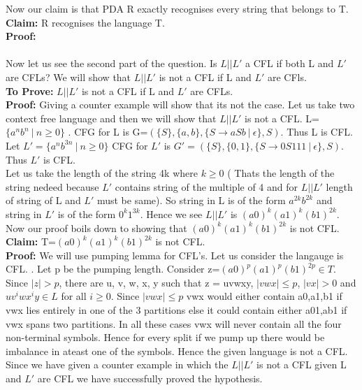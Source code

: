 \documentclass{article}
\begin{document}
Now our claim is that PDA R exactly recognises every string that belongs to T. \\
\textbf{Claim:} R recognises the language T.\\
\textbf{Proof:}\\
\\
\newline
Now let us see the second part of the question. Is $L||L'$ a CFL if both L and $L'$ are
CFLs? We will show that $L|| L'$ is not a CFL if L and $L'$ are CFls. \\
\textbf{To Prove:} $L|| L'$ is not a CFL if L and $L'$ are CFLs. \\
\textbf{Proof:} Giving a counter example will show that its not the case. Let us take two context free language and then we will show that $L || L'$ is not a CFL. L=$\{a^nb^n \ | \ n \geq 0\}$ . CFG for L is G=$(\{S\},\{a,b\},\{S \rightarrow aSb \ | \ \epsilon\},S)$. Thus L is CFL. Let $ L'=\{a^nb^{3n} \ | \ n \geq 0\}$ CFG for $L'$ is $G' =(\{S\},\{0,1\},\{S \rightarrow 0S111 \ | \ \epsilon\},S)$. Thus $L'$ is CFL.\\
Let us take the length of the string 4k where $k \geq 0$ ( Thats the length of the string nedeed because $L'$ contains string of the multiple of 4 and for $L || L'$ length of string of L and $L'$ must be same). So string in L is of the form $a^{2k}b^{2k}$ and string in $L' $ is of the form $0^{k}1^{3k}$. Hence we see $L || L'$ is $(a0)^k (a1)^k (b1)^{2k}$. Now our proof boils down to showing that $(a0)^k (a1)^k (b1)^{2k}$ is not CFL.\\
\textbf{Claim:} T=$(a0)^k (a1)^k (b1)^{2k}$ is not CFL.\\
\textbf{Proof:} We will use pumping lemma for CFL's. Let us consider the langauge is CFL. . Let p be the pumping length. Consider z=$(a0)^p (a1)^p (b1)^{2p} \in T$. Since $|z| > p$, there are u, v, w, x, y such that z = uvwxy, $|vwx| \leq p$, $|vx| > 0$ and $ uv^{i}wx^{i}y \in L$ for all $i \geq 0$. Since $|vwx| \leq p$ vwx would either contain a0,a1,b1 if vwx lies entirely in one of the 3 partitions else it could contain either a01,ab1 if vwx spans two partitions. In all these cases vwx will never contain all the four non-terminal symbols. Hence for every split if we pump up there would be imbalance in ateast one of the symbols. Hence the given language is not a CFL. \\
\newline
Since we have given a counter example in which the $L||L'$ is not a CFL given L and $L'$ are CFL we have successfully proved the hypothesis. 
\end{document}
